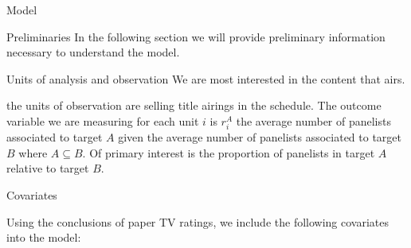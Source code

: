 \begin{chapter}{Model}


\begin{section}{Preliminaries}
  In the following section we will provide preliminary information necessary to
  understand the model.
  \begin{subsection}{Units of analysis and observation}
    We are most interested in the content that airs.

    the units of observation are selling title airings in the schedule. The outcome
    variable we are measuring for each unit $i$ is $r_i^A$ the average number of panelists
    associated to target $A$ given the average number of panelists associated to target $B$
    where $A \subseteq B$. Of primary interest is the proportion of panelists in target $A$ relative to target $B$.

  \end{subsection}

  \begin{subsection}{Covariates}

  Using the conclusions of paper TV ratings, we include the following covariates into the model:


\end{subsection}
\end{section}
\end{chapter}
